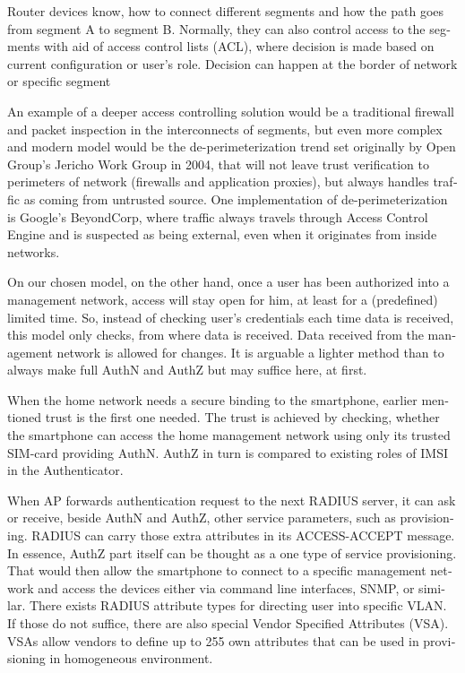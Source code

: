 \documentclass[12pt,a4paper,english]{tutthesis}
\begin{document}
\begin{otherlanguage}{english}
Router devices know, how to connect different segments and how the
path goes from segment A to segment B. Normally, they can also control
access to the segments with aid of access control lists (ACL), where
decision is made based on current configuration or user's role.
Decision can happen at the border of network or specific segment




An example of a deeper access controlling  solution would be a traditional firewall and packet
inspection in the interconnects of segments, but even more complex and modern model
would be the de-perimeterization trend set originally by Open Group's
Jericho Work Group\cite{jericho2004} in 2004, that will not leave trust verification to
perimeters of network (firewalls and application proxies), but 
always handles traffic as coming from untrusted source.
One implementation of de-perimeterization is 
Google's BeyondCorp\cite{2014-beyondcorp}, 
where traffic always travels through Access Control Engine
and is suspected as being external, even when it originates from
inside networks. 



On our chosen model, on the other hand, once a user has been authorized into a management network, access
will stay open for him, at least for a (predefined) limited time.
So, instead of checking user's credentials each time data is received,
this model only checks, from where data is received. 
Data received from the management network is allowed for changes.
It is arguable a lighter method than to always make 
full AuthN and AuthZ but may suffice here, at first.


When the home network needs a secure binding to the smartphone, earlier
mentioned trust is the first one needed.  The trust is achieved by
checking, whether the smartphone can access the home management
network using only its trusted SIM-card providing AuthN. AuthZ in
turn is compared to existing roles of IMSI in the Authenticator.




When AP forwards authentication request to the next RADIUS server, it
can ask or receive, beside AuthN and AuthZ, other service parameters,
such as provisioning. RADIUS can carry those extra attributes in its
ACCESS-ACCEPT message.  In essence, AuthZ part itself can be thought
as a one type of service provisioning.  That would then allow the
smartphone to connect to a specific management network and access the
devices either via command line interfaces, SNMP, or
similar\cite[p.4]{rfc5608}.
There exists RADIUS attribute types for directing user into specific
VLAN. If those do not suffice, there are also special Vendor Specified
Attributes (VSA). VSAs allow vendors to define up to 255 own
attributes that can be used in provisioning in homogeneous environment. 



\end{otherlanguage}
\end{document}

